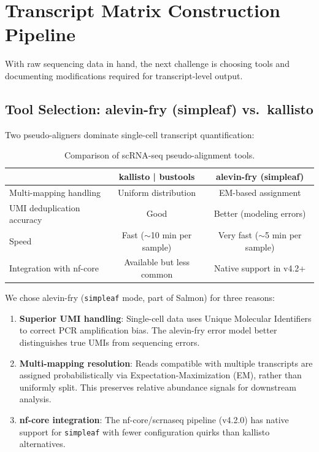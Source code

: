 \section{Transcript Matrix Construction Pipeline}

With raw sequencing data in hand, the next challenge is choosing tools and documenting modifications required for transcript-level output.

\subsection*{Tool Selection: alevin-fry (simpleaf) vs.\ kallisto}

Two pseudo-aligners dominate single-cell transcript quantification:

\begin{table}[htbp]
    \centering
    \caption{Comparison of scRNA-seq pseudo-alignment tools.}\label{tab:pseudoalign-tools}
    \vspace{0.5em}
    \begin{tabular}{lcc}
        \toprule
        & \textbf{kallisto | bustools} & \textbf{alevin-fry (simpleaf)} \\
        \midrule
        Multi-mapping handling & Uniform distribution & EM-based assignment \\
        UMI deduplication accuracy & Good & Better (modeling errors) \\
        Speed & Fast ($\sim$10 min per sample) & Very fast ($\sim$5 min per sample) \\
        Integration with nf-core & Available but less common & Native support in v4.2+ \\
        \bottomrule
    \end{tabular}
\end{table}

We chose alevin-fry (\texttt{simpleaf} mode, part of Salmon) for three reasons:

\begin{enumerate}
    \item \textbf{Superior UMI handling}: Single-cell data uses Unique Molecular Identifiers to correct PCR amplification bias. The alevin-fry error model better distinguishes true UMIs from sequencing errors.
    \item \textbf{Multi-mapping resolution}: Reads compatible with multiple transcripts are assigned probabilistically via Expectation-Maximization (EM), rather than uniformly split. This preserves relative abundance signals for downstream analysis.
    \item \textbf{nf-core integration}: The nf-core/scrnaseq pipeline (v4.2.0) has native support for \texttt{simpleaf} with fewer configuration quirks than kallisto alternatives.
\end{enumerate}

